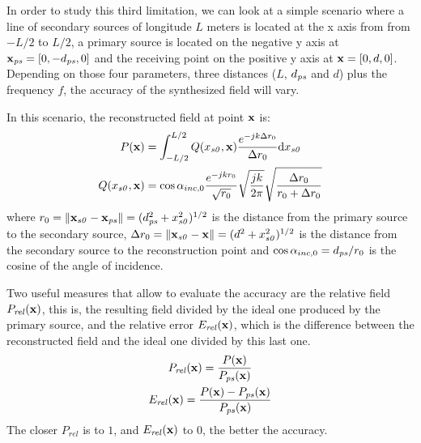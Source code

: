 In order to study this third limitation, we can look at a simple scenario where a line of secondary sources of longitude $L$ meters is located at the x axis from from $-L/2$ to $L/2$, a primary source is located on the negative y axis at $\PosTheo[primarySource] = [0, -d_{\PosTheoSubInd[primarySource]}, 0]$ and the receiving point on the positive y axis at $\PosTheo = [0, d, 0]$. Depending on those four parameters, three distances ($L$, $d_{\PosTheoSubInd[primarySource]}$ and $d$) plus the frequency $f$, the accuracy of the synthesized field will vary.

In this scenario, the reconstructed field at point $\PosTheo$ is:
\begin{equation}
\begin{aligned}
P(\PosTheo) &= \int_{-L/2}^{L/2} Q(x_{\PosTheoSubInd[section]}, \PosTheo) \frac{e^{-jk\distLinePoint}}{\distLinePoint} \mathrm{d}x_{\PosTheoSubInd[section]}\\
Q(x_{\PosTheoSubInd[section]}, \PosTheo) &= \cos\normPrimaryPropAngleSection \frac{e^{-jk\distLinePrimSource}}{\sqrt{\distLinePrimSource}} \sqrt{\frac{j k}{2\pi}} \sqrt{\frac{\distLinePoint}{\distLinePrimSource + \distLinePoint}}
\end{aligned}
\end{equation}
where $\distLinePrimSource = \norm{\PosTheo[section] - \PosTheo[primarySource]} = (d_{\PosTheoSubInd[primarySource]}^2 + x_{\PosTheoSubInd[section]}^2)^{1/2}$ is the distance from the primary source to the secondary source, $\distLinePoint = \norm{\PosTheo[section] - \PosTheo} = (d^2 + x_{\PosTheoSubInd[section]}^2)^{1/2}$ is the distance from the secondary source to the reconstruction point and $\cos\normPrimaryPropAngleSection = d_{\PosTheoSubInd[primarySource]}/\distLinePrimSource$ is the cosine of the angle of incidence.

Two useful measures that allow to evaluate the accuracy are the relative field $P_\mathit{rel}(\PosTheo)$, this is, the resulting field divided by the ideal one produced by the primary source, and the relative error $E_\mathit{rel}(\PosTheo)$, which is the difference between the reconstructed field and the ideal one divided by this last one.
\begin{gather}
	P_\mathit{rel}(\PosTheo) = \frac{P(\PosTheo)}{P_{\PosTheoSubInd[primarySource]}(\PosTheo)} \\
	E_\mathit{rel}(\PosTheo) = \frac{P(\PosTheo) - P_{\PosTheoSubInd[primarySource]}(\PosTheo)}{P_{\PosTheoSubInd[primarySource]}(\PosTheo)}
\end{gather}
The closer $P_\mathit{rel}$ is to $1$, and $E_\mathit{rel}(\PosTheo)$ to $0$, the better the accuracy.

